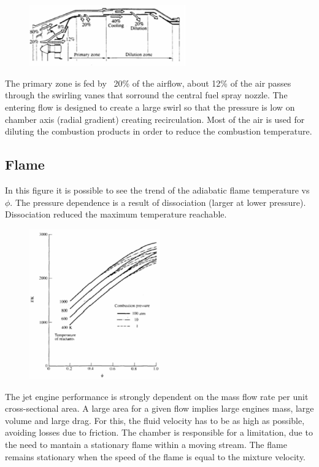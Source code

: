 \documentclass[12pt]{article}
\begin{document}
\begin{figure}[h!]
\centering
\includegraphics[width=0.6\textwidth]{figures/airdistribution.png}
\end{figure}

The primary zone is fed by ~20\% of the airflow, about 12\% of the air passes through the swirling vanes that sorround the central fuel spray nozzle. The entering flow is designed to create a large swirl so that the pressure is low on chamber axis (radial gradient) creating recirculation. Most of the air is used for diluting the combustion products in order to reduce the combustion temperature.

\subsection{Flame}

In this figure it is possible to see the trend of the adiabatic flame temperature vs $\phi$. The pressure dependence is a result of dissociation (larger at lower pressure). Dissociation reduced the maximum temperature reachable.

\begin{figure}[h!]
\centering
\includegraphics[width=0.5\textwidth]{figures/tvsphi.png}
\end{figure}

The jet engine performance is strongly dependent on the mass flow rate per unit cross-sectional area. A large area for a given flow implies large engines mass, large volume and large drag. For this, the fluid velocity has to be as high as possible, avoiding losses due to friction. The chamber is responsible for a limitation, due to the need to mantain a stationary flame within a moving stream. The flame remains stationary when the speed of the flame is equal to the mixture velocity. 
\end{document}

